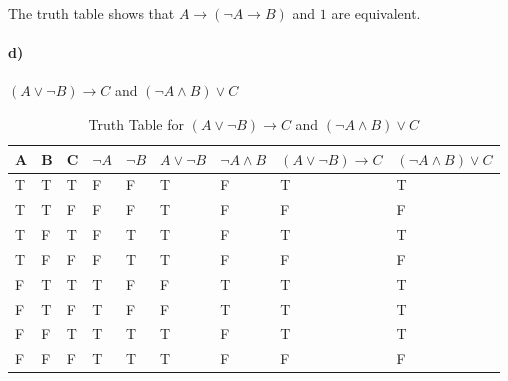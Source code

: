 \documentclass[12pt]{article}
\begin{document}
The truth table shows that $ A \rightarrow (\neg A \rightarrow B) $ and $ 1 $ are equivalent.

\newpage

\paragraph{d)} $ (A \vee \neg B) \rightarrow C $ and $ (\neg A \wedge B) \vee C $

\begin{table}[H]
    \centering
    \begin{tabular}{|l|l|l|l|l|l|l|l|l|}
        \hline
        A & B & C & $\neg A$ & $\neg B$ & $ A \vee \neg B $ & $ \neg A \wedge B $ & $ (A \vee \neg B) \rightarrow C $ & $ (\neg A \wedge B) \vee C $ \\ \hline
        T & T & T & F        & F        & T                 & F                   & T                                 & T                          \\ \hline
        T & T & F & F        & F        & T                 & F                   & F                                 & F                          \\ \hline
        T & F & T & F        & T        & T                 & F                   & T                                 & T                          \\ \hline
        T & F & F & F        & T        & T                 & F                   & F                                 & F                          \\ \hline
        F & T & T & T        & F        & F                 & T                   & T                                 & T                          \\ \hline
        F & T & F & T        & F        & F                 & T                   & T                                 & T                          \\ \hline
        F & F & T & T        & T        & T                 & F                   & T                                 & T                          \\ \hline
        F & F & F & T        & T        & T                 & F                   & F                                 & F                          \\ \hline
    \end{tabular}

    \caption{Truth Table for $ (A \vee \neg B) \rightarrow C $ and $ (\neg A \wedge B) \vee C $}
    \label{t4}
\end{table}
\end{document}
